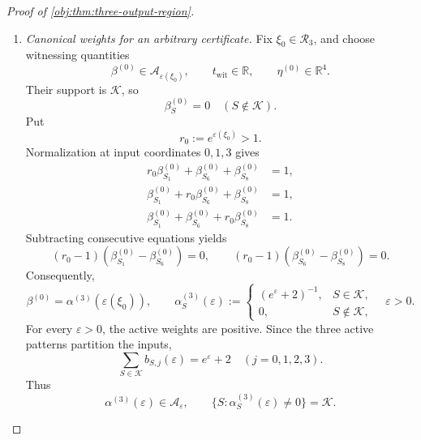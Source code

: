 \begin{proof}[Proof of \cref{obj:thm:three-output-region}]
\begin{enumerate}
\item \textit{Canonical weights for an arbitrary certificate.}
Fix \(\xi_0\in\mathcal R_3\), and choose witnessing quantities
\[
\beta^{(0)}\in\mathcal A_{\varepsilon(\xi_0)},
\qquad t_{\mathrm{wit}}\in\mathbb R,
\qquad \eta^{(0)}\in\mathbb R^4.
\]
Their support is \(\mathcal K\), so
\[
\beta^{(0)}_S=0\quad(S\notin\mathcal K).
\]
Put
\[
r_0:=e^{\varepsilon(\xi_0)}>1.
\]
Normalization at input coordinates \(0,1,3\) gives
\[
\begin{aligned}
r_0\beta^{(0)}_{S_1}+\beta^{(0)}_{S_6}
 +\beta^{(0)}_{S_8}&=1,\\
\beta^{(0)}_{S_1}+r_0\beta^{(0)}_{S_6}
 +\beta^{(0)}_{S_8}&=1,\\
\beta^{(0)}_{S_1}+\beta^{(0)}_{S_6}
 +r_0\beta^{(0)}_{S_8}&=1.
\end{aligned}
\]
Subtracting consecutive equations yields
\[
(r_0-1)(\beta^{(0)}_{S_1}-\beta^{(0)}_{S_6})=0,
\qquad
(r_0-1)(\beta^{(0)}_{S_6}-\beta^{(0)}_{S_8})=0.
\]
Consequently,
\[
\beta^{(0)}=\alpha^{(3)}(\varepsilon(\xi_0)),
\qquad
\alpha^{(3)}_S(\varepsilon):=
\begin{cases}
(e^\varepsilon+2)^{-1},&S\in\mathcal K,\\
0,&S\notin\mathcal K,
\end{cases}
\quad \varepsilon>0.
\]
For every \(\varepsilon>0\), the active weights are positive. Since the three active patterns partition the inputs,
\[
\sum_{S\in\mathcal K}b_{S,j}(\varepsilon)=e^\varepsilon+2
\quad(j=0,1,2,3).
\]
Thus
\[
\alpha^{(3)}(\varepsilon)\in\mathcal A_\varepsilon,
\qquad
\{S:\alpha^{(3)}_S(\varepsilon)\ne0\}=\mathcal K.
\]


\end{enumerate}
\end{proof}
